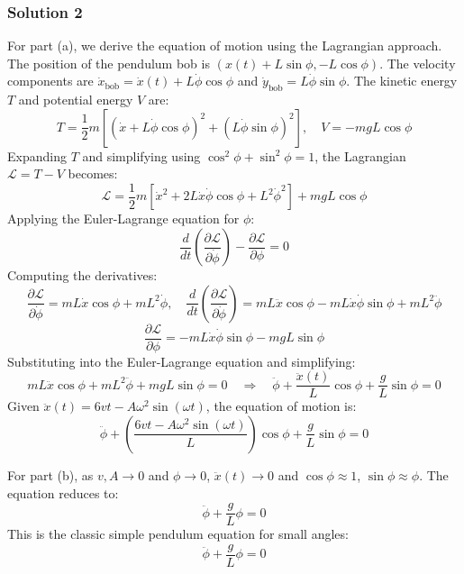\documentclass{article}
\begin{document}
\subsubsection{Solution 2}
For part (a), we derive the equation of motion using the Lagrangian approach. The position of the pendulum bob is $(x(t) + L\sin\phi, -L\cos\phi)$. The velocity components are $\dot{x}_\text{bob} = \dot{x}(t) + L\dot{\phi}\cos\phi$ and $\dot{y}_\text{bob} = L\dot{\phi}\sin\phi$. The kinetic energy $T$ and potential energy $V$ are:
\[
T = \frac{1}{2}m\left[\left(\dot{x} + L\dot{\phi}\cos\phi\right)^2 + \left(L\dot{\phi}\sin\phi\right)^2\right], \quad V = -mgL\cos\phi
\]
Expanding $T$ and simplifying using $\cos^2\phi + \sin^2\phi = 1$, the Lagrangian $\mathcal{L} = T - V$ becomes:
\[
\mathcal{L} = \frac{1}{2}m\left[\dot{x}^2 + 2L\dot{x}\dot{\phi}\cos\phi + L^2\dot{\phi}^2\right] + mgL\cos\phi
\]
Applying the Euler-Lagrange equation for $\phi$:
\[
\frac{d}{dt}\left(\frac{\partial\mathcal{L}}{\partial\dot{\phi}}\right) - \frac{\partial\mathcal{L}}{\partial\phi} = 0
\]
Computing the derivatives:
\[
\frac{\partial\mathcal{L}}{\partial\dot{\phi}} = mL\dot{x}\cos\phi + mL^2\dot{\phi}, \quad \frac{d}{dt}\left(\frac{\partial\mathcal{L}}{\partial\dot{\phi}}\right) = mL\ddot{x}\cos\phi - mL\dot{x}\dot{\phi}\sin\phi + mL^2\ddot{\phi}
\]
\[
\frac{\partial\mathcal{L}}{\partial\phi} = -mL\dot{x}\dot{\phi}\sin\phi - mgL\sin\phi
\]
Substituting into the Euler-Lagrange equation and simplifying:
\[
mL\ddot{x}\cos\phi + mL^2\ddot{\phi} + mgL\sin\phi = 0 \quad \Rightarrow \quad \ddot{\phi} + \frac{\ddot{x}(t)}{L}\cos\phi + \frac{g}{L}\sin\phi = 0
\]
Given $\ddot{x}(t) = 6vt - A\omega^2\sin(\omega t)$, the equation of motion is:
\[
\boxed{\ddot{\phi} + \left(\frac{6vt - A\omega^2\sin(\omega t)}{L}\right)\cos\phi + \frac{g}{L}\sin\phi = 0}
\]

For part (b), as $v, A \to 0$ and $\phi \to 0$, $\ddot{x}(t) \to 0$ and $\cos\phi \approx 1$, $\sin\phi \approx \phi$. The equation reduces to:
\[
\ddot{\phi} + \frac{g}{L}\phi = 0
\]
This is the classic simple pendulum equation for small angles:
\[
\boxed{\ddot{\phi} + \frac{g}{L}\phi = 0}
\]
\end{document}
